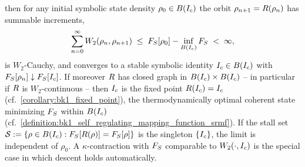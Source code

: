 \begin{theorem}
then for any initial symbolic state density $\rho_0 \in B(I_c)$ the orbit $\rho_{n+1} = R(\rho_n)$ has summable increments,
\[
\sum_{n=0}^{\infty}W_2(\rho_n,\rho_{n+1}) \;\le\; F_S[\rho_0] - \inf_{B(I_c)}F_S \;<\; \infty,
\]
is $W_2$-Cauchy, and converges to a stable symbolic identity $I_c \in B(I_c)$ with $F_S[\rho_n] \downarrow F_S[I_c]$. If moreover $R$ has closed graph in $B(I_c)\times B(I_c)$ -- in particular if $R$ is $W_2$-continuous -- then $I_c$ is the fixed point $R(I_c) = I_c$ (cf.~\ref{corollary:bk1_fixed_point}), the thermodynamically optimal coherent state minimizing $F_S$ within $B(I_c)$ (cf.~\ref{definition:bk1_self_regulating_mapping_function_srmf}). If the stall set $\mathcal{S} := \{\rho \in B(I_c) : F_S[R(\rho)] = F_S[\rho]\}$ is the singleton $\{I_c\}$, the limit is independent of $\rho_0$. A $\kappa$-contraction with $F_S$ comparable to $W_2(\cdot,I_c)$ is the special case in which descent holds automatically.
\end{theorem}

